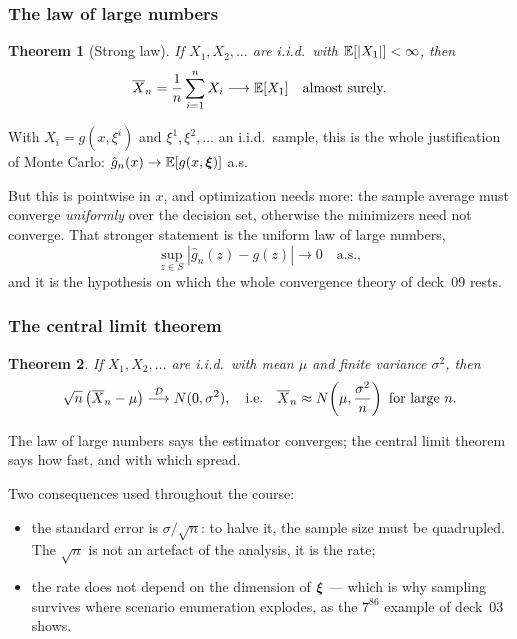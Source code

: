 \documentclass[aspectratio=169]{beamer}
\newtheorem{theo}{Theorem}
\begin{document}
\begin{frame}
\frametitle{The law of large numbers}
\small

\begin{theo}[Strong law]
If $X_1, X_2, \ldots$ are i.i.d.\ with ${\mathbb{E}}[|X_1|] < \infty$, then
\[
\overline{X}_n = \frac{1}{n}\sum_{i=1}^n X_i \longrightarrow {\mathbb{E}}[X_1] \quad \text{almost surely.}
\]
\end{theo}

With $X_i = g(x,\xi^i)$ and $\xi^1, \xi^2, \ldots$ an i.i.d.\ sample, this is the whole justification of {\red Monte Carlo}: $\hat{g}_n(x) \rightarrow {\mathbb{E}}[g(x,{\boldsymbol{\xi}})]$ a.s.

{\red But this is pointwise in $x$}, and optimization needs more: the sample average must converge {\it uniformly} over the decision set, otherwise the minimizers need not converge. That stronger statement is the {\red uniform law of large numbers},
\[
\sup_{z \in S} \left| \hat{g}_n(z) - g(z) \right| \longrightarrow 0 \quad \text{a.s.},
\]
and it is the hypothesis on which the whole convergence theory of deck~09 rests.

\end{frame}

\begin{frame}
\frametitle{The central limit theorem}

\begin{theo}
If $X_1, X_2, \ldots$ are i.i.d.\ with mean $\mu$ and {\red finite} variance $\sigma^2$, then
\[
\sqrt{n}\left(\overline{X}_n - \mu\right) \overset{{\mathcal{D}}}{\longrightarrow} N(0, \sigma^2),
\quad \text{i.e.} \quad
\overline{X}_n \approx N\!\left(\mu, \frac{\sigma^2}{n}\right) \text{ for large } n.
\]
\end{theo}

The law of large numbers says the estimator converges; the central limit theorem says {\red how fast}, and with which spread.

\mbox{}

Two consequences used throughout the course:
\begin{itemize}
\item
the standard error is $\sigma/\sqrt{n}$: to {\red halve} it, the sample size must be {\red quadrupled}. The $\sqrt{n}$ is not an artefact of the analysis, it is the rate;
\item
the rate does not depend on the dimension of ${\boldsymbol{\xi}}$ --- which is why sampling survives where scenario enumeration explodes, as the $7^{86}$ example of deck~03 shows.
\end{itemize}

\end{frame}
\end{document}
